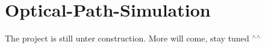 \chapter{Optical-\/\+Path-\/\+Simulation}
\hypertarget{md__r_e_a_d_m_e}{}\label{md__r_e_a_d_m_e}
\label{md__r_e_a_d_m_e_autotoc_md0}%
%
 The project is still unter construction. More will come, stay tuned \texorpdfstring{$^\wedge$}{\string^}\texorpdfstring{$^\wedge$}{\string^} 